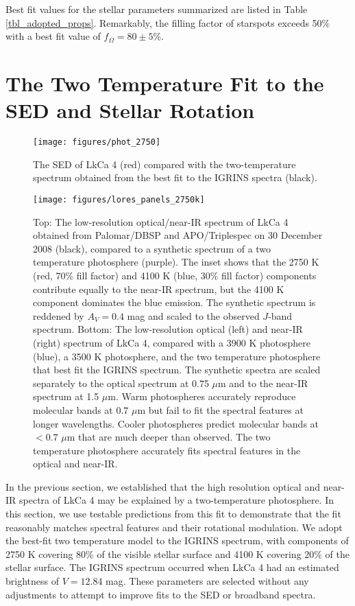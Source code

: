 \documentclass[twocolumn]{emulateapj}%
\begin{document}
Best fit values for the stellar parameters summarized are listed in Table \ref{tbl_adopted_props}.  Remarkably, the filling factor of starspots exceeds 50\% with a best fit value of $f_{\Omega}=80\pm 5 \% $.




\section{The Two Temperature Fit to the SED and Stellar Rotation}\label{sec:GJHsection4}

\begin{figure}
 \centering
 \texttt{[image: figures/phot\_2750]}
\caption{The SED of LkCa 4 (red) compared with the two-temperature spectrum obtained from the best fit to the IGRINS spectra (black).}
\label{fig:sed}
\end{figure}


\begin{figure*}
 \centering
 \texttt{[image: figures/lores\_panels\_2750k]}
 \caption{Top:  The low-resolution optical/near-IR spectrum of LkCa 4 obtained from Palomar/DBSP and APO/Triplespec on 30 December 2008 (black), compared to a synthetic spectrum of a two temperature photosphere (purple).  The inset shows that the 2750 K (red, 70\% fill factor) and 4100 K (blue, 30\% fill factor) components contribute equally to the near-IR spectrum, but the 4100 K component dominates the blue emission.  The synthetic spectrum is reddened by $A_V=0.4$ mag and scaled to the observed $J$-band spectrum. Bottom:  The low-resolution optical (left) and near-IR (right) spectrum of LkCa 4, compared with a 3900 K photosphere (blue), a 3500 K photosphere, and the two temperature photosphere that best fit the IGRINS spectrum.  The synthetic spectra are scaled separately to the optical spectrum at 0.75 $\mu$m and to the near-IR spectrum at 1.5 $\mu$m.  Warm photospheres accurately reproduce molecular bands at $0.7$ $\mu$m but fail to fit the spectral features at longer wavelengths.  Cooler photospheres predict molecular bands at $<0.7$ $\mu$m that are much deeper than observed.  The two temperature photosphere accurately fits spectral features in the optical and near-IR.}
 \label{fig:lores}
\end{figure*}



In the previous section, we established that the high resolution optical and near-IR spectra of LkCa 4 may be explained by a two-temperature photosphere.  In this section, we use testable predictions from this fit to demonstrate that the fit reasonably matches spectral features and their rotational modulation.  We adopt the best-fit two temperature model to the IGRINS spectrum, with components of 2750 K covering 80\% of the visible stellar surface and 4100 K covering 20\% of the stellar surface.  The IGRINS spectrum occurred when LkCa 4 had an estimated brightness of $V=12.84$ mag.  These parameters are selected without any adjustments to attempt to improve fits to the SED or broadband spectra.
\end{document}
